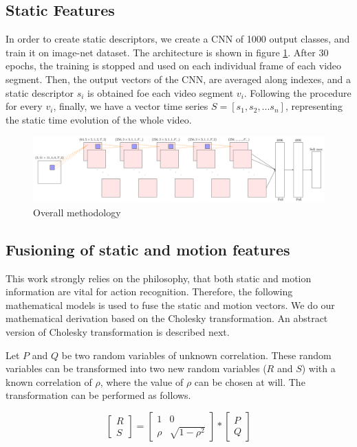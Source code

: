 \subsection{Static Features}

In order to create static descriptors, we create a CNN of 1000 output classes, and train it on image-net dataset. The architecture is shown in figure \ref{fi:cnn}.
After 30 epochs, the training is stopped and used on each individual frame of each video segment. Then, the output vectors of the CNN,
are averaged 
along indexes, and a static descriptor $s_{i}$ is obtained foe each video segment $v_{i}$. Following the 
procedure for every $v_{i}$, finally, we have a vector time series 
$S =[s_{1}, s_{2},...s_{n}]$, representing the static time evolution of the whole video. 

\begin{figure}
  \centering
  \includegraphics[scale=0.5]{./figures/nw.pdf} 
  \caption{Overall methodology}\label{fi:cnn}
\end{figure}

\subsection{Fusioning of static and motion features}
This work strongly relies on the philosophy, that both static and motion information
are vital for action recognition. Therefore, the following mathematical models is used
to fuse the static and motion vectors. We do our mathematical derivation based on the Cholesky transformation. An 
abstract version of Cholesky transformation is described next. 

Let $P$ and $Q$ be two random variables of unknown correlation. These random variables can be
transformed into two new random variables ($R$ and $S$) with a known correlation of $\rho$, where the 
value of $\rho$ can be chosen at will. The transformation can be performed as follows.

\[
\begin{bmatrix}
    R     \\
    S     
\end{bmatrix}
=
\begin{bmatrix}
    1  & 0 \\
    \rho  & \sqrt{1-\rho^2}    
\end{bmatrix}
*
\begin{bmatrix}
    P     \\
    Q     
\end{bmatrix}
\]

